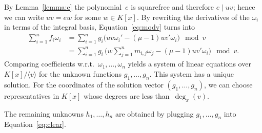 \documentclass[final,1p,times,authoryear]{elsarticle}
\def\<#1>{\langle#1\rangle}
\begin{document}
By Lemma~\ref{lemma:e} the polynomial~$e$ is squarefree and therefore $e\mid uv$;
hence we can write $uv=ew$ for some $w\in K[x]$. By rewriting the
derivatives of the $\omega_i$ in terms of the integral basis,
Equation~\eqref{eq:modv} turns into
\begin{align*}
  \sum_{i=1}^n f_i\omega_i
  &= \sum_{i=1}^n g_i \bigl( uv\omega_i' - (\mu-1)uv'\omega_i \bigr) \mod v\\
  &= \sum_{i=1}^n g_i\, \biggl( w\sum_{j=1}^n m_{i,j}\omega_j - (\mu-1)uv'\omega_i \biggr) \mod v.
\end{align*}
Comparing coefficients w.r.t.\ $\omega_1,\ldots,\omega_n$ yields a
system of linear equations over $K[x]/\<v>$ for the unknown
functions $g_1,\ldots,g_n$. This system has
a unique solution. For the coordinates of the solution vector $(g_1,\dots,g_n)$,
we can choose representatives in $K[x]$ whose degrees are less than~$\deg_x(v)$.

The remaining unknowns $h_1,\ldots,h_n$ are obtained by plugging
$g_1,\ldots,g_n$ into Equation~\eqref{eq:clear}.
\end{document}
